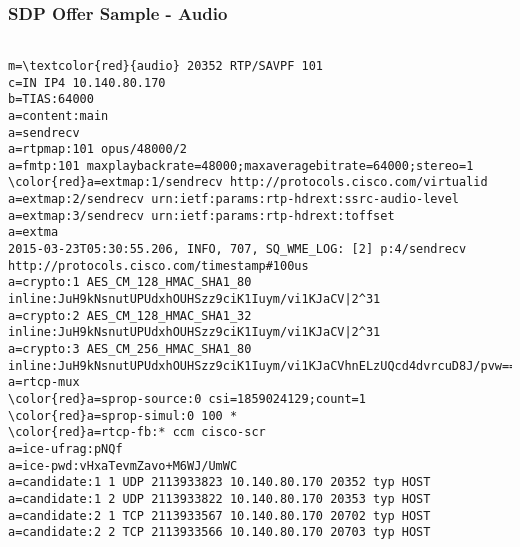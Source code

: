 \documentclass{beamer}
\begin{document}
\begin{frame}[fragile]
  \frametitle{SDP Offer Sample - Audio}

\begin{center}
  \begin{BVerbatim}[fontfamily=courier, fontsize=\relsize{-5}, commandchars=\\\{\}]

m=\textcolor{red}{audio} 20352 RTP/SAVPF 101
c=IN IP4 10.140.80.170
b=TIAS:64000
a=content:main
a=sendrecv
a=rtpmap:101 opus/48000/2
a=fmtp:101 maxplaybackrate=48000;maxaveragebitrate=64000;stereo=1
\color{red}a=extmap:1/sendrecv http://protocols.cisco.com/virtualid
a=extmap:2/sendrecv urn:ietf:params:rtp-hdrext:ssrc-audio-level
a=extmap:3/sendrecv urn:ietf:params:rtp-hdrext:toffset
a=extma
2015-03-23T05:30:55.206, INFO, 707, SQ_WME_LOG: [2] p:4/sendrecv http://protocols.cisco.com/timestamp#100us
a=crypto:1 AES_CM_128_HMAC_SHA1_80 inline:JuH9kNsnutUPUdxhOUHSzz9ciK1Iuym/vi1KJaCV|2^31
a=crypto:2 AES_CM_128_HMAC_SHA1_32 inline:JuH9kNsnutUPUdxhOUHSzz9ciK1Iuym/vi1KJaCV|2^31
a=crypto:3 AES_CM_256_HMAC_SHA1_80 inline:JuH9kNsnutUPUdxhOUHSzz9ciK1Iuym/vi1KJaCVhnELzUQcd4dvrcuD8J/pvw==|2^31
a=rtcp-mux
\color{red}a=sprop-source:0 csi=1859024129;count=1
\color{red}a=sprop-simul:0 100 *
\color{red}a=rtcp-fb:* ccm cisco-scr
a=ice-ufrag:pNQf
a=ice-pwd:vHxaTevmZavo+M6WJ/UmWC
a=candidate:1 1 UDP 2113933823 10.140.80.170 20352 typ HOST
a=candidate:1 2 UDP 2113933822 10.140.80.170 20353 typ HOST
a=candidate:2 1 TCP 2113933567 10.140.80.170 20702 typ HOST
a=candidate:2 2 TCP 2113933566 10.140.80.170 20703 typ HOST
\end{BVerbatim}
\end{center}
\end{frame}
\end{document}
